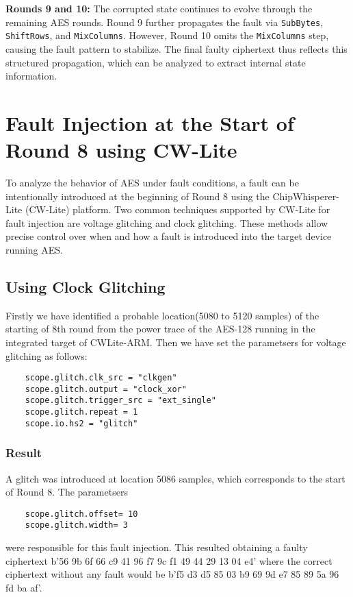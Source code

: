 \textbf{Rounds 9 and 10:}
The corrupted state continues to evolve through the remaining AES rounds. Round 9 further propagates the fault via \texttt{SubBytes}, \texttt{ShiftRows}, and \texttt{MixColumns}. However, Round 10 omits the \texttt{MixColumns} step, causing the fault pattern to stabilize. The final faulty ciphertext thus reflects this structured propagation, which can be analyzed to extract internal state information.

\section{Fault Injection at the Start of Round 8 using CW-Lite}

To analyze the behavior of AES under fault conditions, a fault can be intentionally introduced at the beginning of Round 8 using the ChipWhisperer-Lite (CW-Lite) platform. Two common techniques supported by CW-Lite for fault injection are voltage glitching and clock glitching. These methods allow precise control over when and how a fault is introduced into the target device running AES.

\subsection{Using Clock Glitching}
Firstly we have identified a probable location(5080 to 5120 samples) of the starting of 8th round from the power trace of the AES-128 running in the integrated target of CWLite-ARM. Then we have set the parametsers for voltage glitching as follows:
\begin{verbatim}
    scope.glitch.clk_src = "clkgen"
    scope.glitch.output = "clock_xor"
    scope.glitch.trigger_src = "ext_single"
    scope.glitch.repeat = 1
    scope.io.hs2 = "glitch"
\end{verbatim}
\subsubsection{Result}
A glitch was introduced at location 5086 samples, which corresponds to the start of Round 8. The parametsers 
\begin{verbatim}
    scope.glitch.offset= 10
    scope.glitch.width= 3
\end{verbatim}
were responsible for this fault injection. This resulted obtaining a faulty ciphertext b'56 9b 6f 66 c9 41 96 f7 9c f1 49 44 29 13 04 e4' where the correct ciphertext without any fault would be b'f5 d3 d5 85 03 b9 69 9d e7 85 89 5a 96 fd ba af'.


